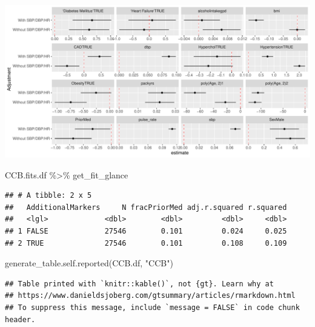 \documentclass[
]{article}
\newenvironment{Shaded}{\begin{snugshade}}{\end{snugshade}}
\newcommand{\FunctionTok}[1]{\textcolor[rgb]{0.00,0.00,0.00}{#1}}
\newcommand{\NormalTok}[1]{#1}
\newcommand{\SpecialCharTok}[1]{\textcolor[rgb]{0.00,0.00,0.00}{#1}}
\newcommand{\StringTok}[1]{\textcolor[rgb]{0.31,0.60,0.02}{#1}}
\begin{document}
\includegraphics{../results/report_files/figure-latex/CCB-fit-forest-1.pdf}

\begin{Shaded}
\begin{Highlighting}[]
\NormalTok{CCB.fits.df }\SpecialCharTok{\%\textgreater{}\%} 
\NormalTok{  get\_fit\_glance}
\end{Highlighting}
\end{Shaded}

\begin{verbatim}
## # A tibble: 2 x 5
##   AdditionalMarkers     N fracPriorMed adj.r.squared r.squared
##   <lgl>             <dbl>        <dbl>         <dbl>     <dbl>
## 1 FALSE             27546        0.101         0.024     0.025
## 2 TRUE              27546        0.101         0.108     0.109
\end{verbatim}

\begin{Shaded}
\begin{Highlighting}[]
\FunctionTok{generate\_table.self.reported}\NormalTok{(CCB.df, }\StringTok{"CCB"}\NormalTok{)}
\end{Highlighting}
\end{Shaded}

\begin{verbatim}
## Table printed with `knitr::kable()`, not {gt}. Learn why at
## https://www.danieldsjoberg.com/gtsummary/articles/rmarkdown.html
## To suppress this message, include `message = FALSE` in code chunk header.
\end{verbatim}
\end{document}
